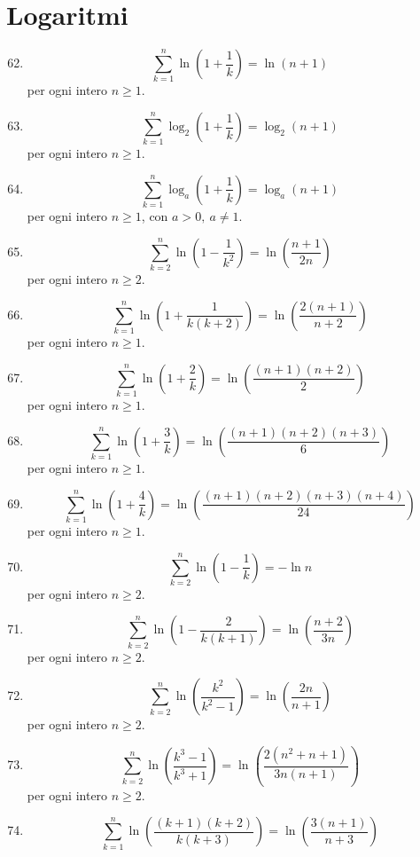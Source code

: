 \documentclass[11pt,a4paper]{article}
\begin{document}
\section*{Logaritmi}
\begin{enumerate}
\setcounter{enumi}{61}
\item \[ \sum_{k=1}^{n} \ln\left(1 + \frac{1}{k}\right) = \ln\left(n + 1\right) \]
{\small per ogni intero $n\ge 1$.}
\item \[ \sum_{k=1}^{n} \log_{2}\left(1 + \frac{1}{k}\right) = \log_{2}\left(n + 1\right) \]
{\small per ogni intero $n\ge 1$.}
\item \[ \sum_{k=1}^{n} \log_{a}\left(1 + \frac{1}{k}\right) = \log_{a}\left(n + 1\right) \]
{\small per ogni intero $n\ge 1$, con $a>0,\ a\neq1$.}
\item \[ \sum_{k=2}^{n} \ln\left(1 - \frac{1}{k^{2}}\right) = \ln\left(\frac{n + 1}{2n}\right) \]
{\small per ogni intero $n\ge 2$.}
\item \[ \sum_{k=1}^{n} \ln\left(1 + \frac{1}{k\left(k + 2\right)}\right) = \ln\left(\frac{2\left(n + 1\right)}{n + 2}\right) \]
{\small per ogni intero $n\ge 1$.}
\item \[ \sum_{k=1}^{n} \ln\left(1 + \frac{2}{k}\right) = \ln\left(\frac{\left(n + 1\right)\left(n + 2\right)}{2}\right) \]
{\small per ogni intero $n\ge 1$.}
\item \[ \sum_{k=1}^{n} \ln\left(1 + \frac{3}{k}\right) = \ln\left(\frac{\left(n + 1\right)\left(n + 2\right)\left(n + 3\right)}{6}\right) \]
{\small per ogni intero $n\ge 1$.}
\item \[ \sum_{k=1}^{n} \ln\left(1 + \frac{4}{k}\right) = \ln\left(\frac{\left(n + 1\right)\left(n + 2\right)\left(n + 3\right)\left(n + 4\right)}{24}\right) \]
{\small per ogni intero $n\ge 1$.}
\item \[ \sum_{k=2}^{n} \ln\left(1 - \frac{1}{k}\right) = -\ln n \]
{\small per ogni intero $n\ge 2$.}
\item \[ \sum_{k=2}^{n} \ln\left(1 - \frac{2}{k\left(k + 1\right)}\right) = \ln\left(\frac{n + 2}{3n}\right) \]
{\small per ogni intero $n\ge 2$.}
\item \[ \sum_{k=2}^{n} \ln\left(\frac{k^{2}}{k^{2} - 1}\right) = \ln\left(\frac{2n}{n + 1}\right) \]
{\small per ogni intero $n\ge 2$.}
\item \[ \sum_{k=2}^{n} \ln\left(\frac{k^{3} - 1}{k^{3} + 1}\right) = \ln\left(\frac{2\left(n^{2} + n + 1\right)}{3n\left(n + 1\right)}\right) \]
{\small per ogni intero $n\ge 2$.}
\item \[ \sum_{k=1}^{n} \ln\left(\frac{\left(k + 1\right)\left(k + 2\right)}{k\left(k + 3\right)}\right) = \ln\left(\frac{3\left(n + 1\right)}{n + 3}\right) \]

\end{enumerate}
\end{document}

